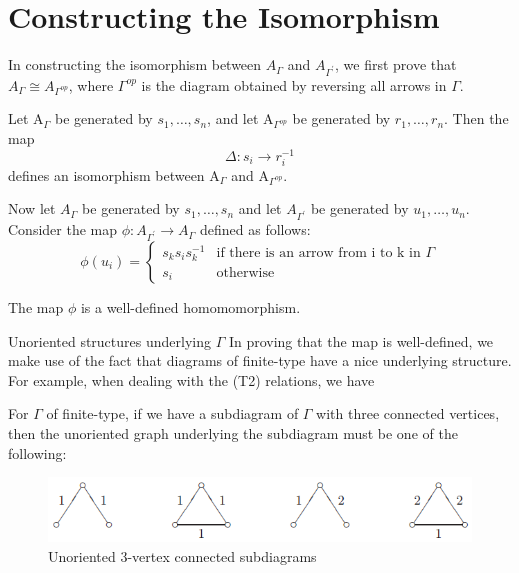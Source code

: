 \documentclass{beamer}
\begin{document}
\section{Constructing the Isomorphism}

\begin{frame}
In constructing the isomorphism between $A_{\Gamma}$ and $A_{\Gamma^{\prime}}$, we first prove that $A_{\Gamma} \cong A_{\Gamma^{op}}$, where $\Gamma^{op}$ is the diagram obtained by reversing all arrows in $\Gamma$.
\begin{lemma}
Let A$_{\Gamma}$ be generated by $s_{1}, \dots, s_{n}$, and let A$_{\Gamma^{op}}$ be generated by $r_{1}, \dots, r_{n}$. Then the map $$\Delta: s_{i} \rightarrow r_{i}^{-1}$$ defines an isomorphism between A$_{\Gamma}$ and A$_{\Gamma^{op}}.$
\end{lemma}
\end{frame}

\begin{frame}
Now let $A_{\Gamma}$ be generated by $s_{1}, \dots, s_{n}$ and let $A_{\Gamma^{\prime}}$ be generated by $u_{1}, \dots, u_{n}$. Consider the map $\phi: A_{\Gamma^{\prime}} \rightarrow A_{\Gamma}$ defined as follows:
$$\phi(u_{i}) = 
\begin{cases}
s_{k}s_{i}s_{k}^{-1} &\text{if there is an arrow from i to k in $\Gamma$} \\
s_{i} &\text{otherwise}
\end{cases}$$

\begin{lemma}
The map $\phi$ is a well-defined homomomorphism.
\end{lemma}
\end{frame}

\begin{frame}{Unoriented structures underlying $\Gamma$}
In proving that the map is well-defined, we make use of the fact that diagrams of finite-type have a nice underlying structure. For example, when dealing with the (T2) relations, we have
\begin{lemma}
For $\Gamma$ of finite-type, if we have a subdiagram of $\Gamma$ with three connected vertices, then the unoriented graph underlying the subdiagram must be one of the following:
\begin{figure}[h]
\centering
\includegraphics[scale = .65]{3vertconnected.PNG}
\caption{Unoriented 3-vertex connected subdiagrams}
\end{figure}
\end{lemma}

\end{frame}
\end{document}
